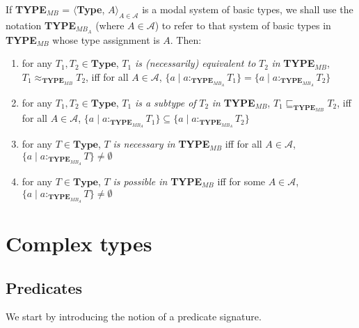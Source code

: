 If {\bf TYPE$_{\mathit{MB}}$} = $\langle${\bf Type},
$A\rangle_{A\in\mathcal{A}}$
is a modal system of basic types, we shall use the notation {\bf
  TYPE$_{\mathit{MB}_A}$} (where $A\in\mathcal{A}$) to refer to that
system of basic types in {\bf TYPE$_{\mathit{MB}}$} whose type assignment is
$A$.    Then:  
\begin{enumerate} 
 
\item for any $T_1,T_2\in\textbf{Type}$, $T_1$ \textit{is
    (necessarily) equivalent
    to} $T_2$ \textit{in} {\bf TYPE$_{\mathit{MB}}$},
  $T_1\approx_{\mathbf{TYPE_{\mathit{MB}}}}T_2$,  iff for all
  $A\in\mathcal{A}$, $\{a\mid a:_{\mathbf{TYPE}_{\mathit{MB}_A}}T_1\}=\{a\mid a:_{\mathbf{TYPE}_{\mathit{MB}_A}}T_2\}$
  
 
\item for any $T_1,T_2\in\textbf{Type}$, $T_1$ \textit{is a subtype of} $T_2$ \textit{in} {\bf TYPE$_{\mathit{MB}}$},
  $T_1\sqsubseteq_{\mathbf{TYPE_{\mathit{MB}}}}T_2$,  iff for all
  $A\in\mathcal{A}$, $\{a\mid a:_{\mathbf{TYPE}_{\mathit{MB}_A}}T_1\}\subseteq\{a\mid a:_{\mathbf{TYPE}_{\mathit{MB}_A}}T_2\}$

\item for any $T\in\textbf{Type}$, $T$ \textit{is necessary in} {\bf TYPE$_{\mathit{MB}}$}  iff for all
  $A\in\mathcal{A}$, \\ $\{a\mid a:_{\mathbf{TYPE}_{\mathit{MB}_A}}T\}\not=\emptyset$

\item for any $T\in\textbf{Type}$, $T$ \textit{is possible in} {\bf TYPE$_{\mathit{MB}}$}  iff for some
  $A\in\mathcal{A}$, \\ $\{a\mid a:_{\mathbf{TYPE}_{\mathit{MB}_A}}T\}\not=\emptyset$
 
\end{enumerate}  

\section{Complex types}

\subsection{Predicates}
\label{app:predicates}
We start by introducing the notion of a predicate signature.

